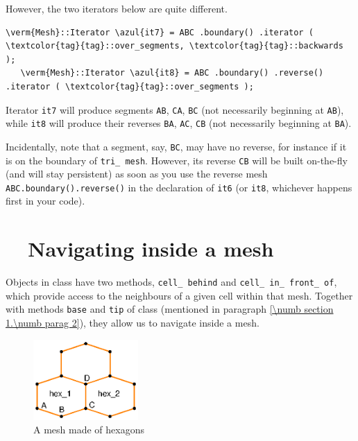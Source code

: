However, the two iterators below are quite different.

\begin{Verbatim}[commandchars=\\\{\},formatcom=\small\tt,
   baselinestretch=0.94,framesep=2mm                      ]
   \verm{Mesh}::Iterator \azul{it7} = ABC .boundary() .iterator ( \textcolor{tag}{tag}::over_segments, \textcolor{tag}{tag}::backwards );
   \verm{Mesh}::Iterator \azul{it8} = ABC .boundary() .reverse() .iterator ( \textcolor{tag}{tag}::over_segments );
\end{Verbatim}

Iterator {\small\tt it7} will produce segments {\small\tt AB}, {\small\tt CA}, {\small\tt BC}
(not necessarily beginning at {\small\tt AB}), while {\small\tt it8} will produce their reverses
{\small\tt BA}, {\small\tt AC}, {\small\tt CB} (not necessarily beginning at {\small\tt BA}).

Incidentally, note that a segment, say, {\small\tt BC}, may have no reverse,
for instance if it is on the boundary of {\small\tt tri\_\,mesh}.
However, its reverse {\small\tt CB} will be built on-the-fly (and will stay persistent)
as soon as you use the reverse mesh {\small\tt ABC.boundary().reverse()} in the declaration of
{\small\tt it6} (or {\small\tt it8}, whichever happens first in your code).


\section{~~Navigating inside a mesh}\label{\numb section 9.\numb parag 6}

Objects in class {\small\tt {}} have two methods, {\small\tt cell\_\,behind} and
{\small\tt cell\_\,in\_\,front\_\,of},
which provide access to the neighbours of a given cell within that mesh.
Together with methods {\small\tt base} and {\small\tt tip} of class {\small\tt {}}
(mentioned in paragraph \ref{\numb section 1.\numb parag 2}), they allow us to navigate inside
a mesh.

\begin{figure}[ht] \centering
  \includegraphics[width=40mm]{malha-hex}
  \caption{A mesh made of hexagons}
  \label{\numb section 9.\numb fig 3}
\end{figure}

